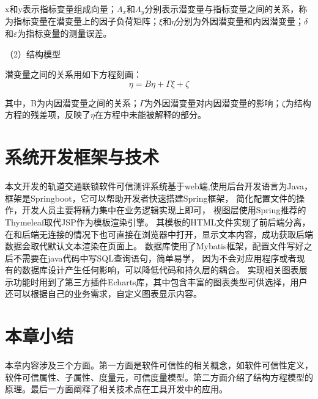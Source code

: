 x和y表示指标变量组成向量；$\Lambda_x$和$\Lambda_y$分别表示潜变量与指标变量之间的关系，称为指标变量在潜变量上的因子负荷矩阵；$\xi$和$\eta$分别为外因潜变量和内因潜变量；$\delta$和$\varepsilon$为指标变量的测量误差\cite{吴明隆2010结构方程模型}。

（2）结构模型

潜变量之间的关系用如下方程刻画\cite{程开明2006结构方程模型的特点及应用}：
\begin{equation}
    \eta=B\eta+\Gamma\xi+\zeta
\end{equation}

其中，B为内因潜变量之间的关系；$\Gamma$为外因潜变量对内因潜变量的影响；$\zeta$为结构方程的残差项，反映了$\eta$在方程中未能被解释的部分\cite{邹德玲2016网络嵌入视角下KIBS企业服务创新绩效影响机制研究}。

\section{系统开发框架与技术}
本文开发的轨道交通联锁软件可信测评系统基于web端,使用后台开发语言为Java，框架是Springboot，它可以帮助开发者快速搭建Spring框架，
简化配置文件的操作，开发人员主要将精力集中在业务逻辑实现上即可\cite{Gutierrez2017Spring}，
视图层使用Spring推荐的Thymeleaf取代JSP作为模板渲染引擎。
其模板的HTML文件实现了前后端分离，在和后端无连接的情况下也可直接在浏览器中打开，显示文本内容，成功获取后端数据会取代默认文本渲染在页面上\cite{2012Spring}。
数据库使用了Mybatis框架，配置文件写好之后不需要在java代码中写SQL查询语句，简单易学，
因为不会对应用程序或者现有的数据库设计产生任何影响，可以降低代码和持久层的耦合。
实现相关图表展示功能时用到了第三方插件Echarts库，其中包含丰富的图表类型可供选择，用户还可以根据自己的业务需求，自定义图表显示内容。



\section{本章小结}
本章内容涉及三个方面。第一方面是软件可信性的相关概念，如软件可信性定义，软件可信属性、子属性、度量元，可信度量模型。第二方面介绍了结构方程模型的原理。最后一方面阐释了相关技术点在工具开发中的应用。

\label{ch2}



